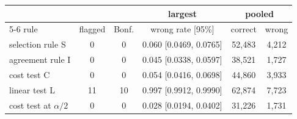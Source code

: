 \begin{tabular}{@{}lccccc@{}}
\toprule
 & & & largest & \multicolumn{2}{c}{pooled}\\
\cmidrule(lr){5-6}
 rule & flagged & Bonf. & wrong rate [95\%] & correct & wrong\\
\midrule
selection rule S & 0 & 0 & 0.060 [0.0469, 0.0765] & 52,483 & 4,212\\
agreement rule I & 0 & 0 & 0.045 [0.0338, 0.0597] & 38,521 & 1,727\\
cost test C & 0 & 0 & 0.054 [0.0416, 0.0698] & 44,860 & 3,933\\
linear test L & 11 & 10 & 0.997 [0.9912, 0.9990] & 62,874 & 7,723\\
cost test at $\alpha/2$ & 0 & 0 & 0.028 [0.0194, 0.0402] & 31,226 & 1,731\\
\bottomrule
\end{tabular}
